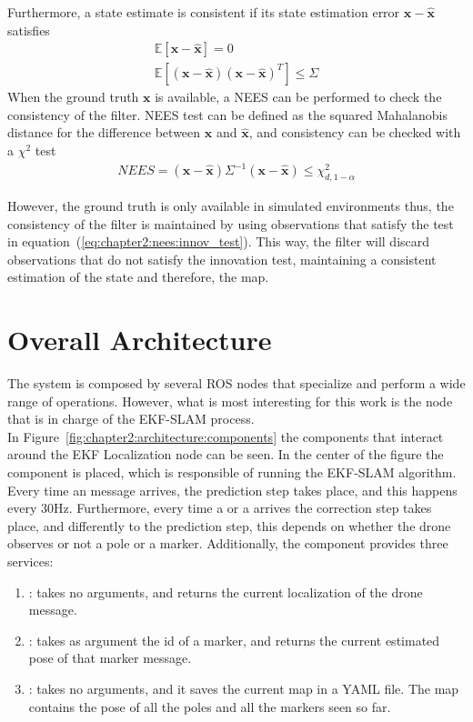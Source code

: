 Furthermore, a state estimate is consistent if its state estimation error $\bm{x} - \bm{\hat{x}}$ satisfies
\begin{align*}
    \mathbb{E}\left[\bm{x} - \bm{\hat{x}}\right] = 0\\
    \mathbb{E}\left[\left(\bm{x} - \bm{\hat{x}}\right)\left(\bm{x} - \bm{\hat{x}}\right)^T\right] \le \Sigma
\end{align*}
When the ground truth $\bm{x}$ is available, a \ac{NEES} can be performed to check the consistency of the filter. NEES test can be defined as the squared Mahalanobis distance for the difference between $\bm{x}$ and $\bm{\hat{x}}$, and consistency can be checked with a $\chi^2$ test
\begin{align*}
    NEES = \left(\bm{x} - \bm{\hat{x}}\right) \Sigma^{-1} \left(\bm{x} - \bm{\hat{x}}\right) \le \chi_{d, 1-\alpha}^2
\end{align*}

However, the ground truth is only available in simulated environments thus, the consistency of the filter is maintained by using observations that satisfy the test in equation~(\ref{eq:chapter2:nees:innov_test}). This way, the filter will discard observations that do not satisfy the innovation test, maintaining a consistent estimation of the state and therefore, the map.

\section{Overall Architecture}
\label{sec:chapter2:arch}
The system is composed by several ROS nodes that specialize and perform a wide range of operations. However, what is most interesting for this work is the node that is in charge of the EKF-SLAM process. \\

In Figure~\ref{fig:chapter2:architecture:components} the components that interact around the EKF Localization node can be seen. In the center of the figure the  component is placed, which is responsible of running the EKF-SLAM algorithm. Every time an  message arrives, the prediction step takes place, and this happens every 30Hz. Furthermore, every time a  or a  arrives the correction step takes place, and differently to the prediction step, this depends on whether the drone observes or not a pole or a marker. Additionally, the  component provides three services:
\begin{enumerate}
    \item {}: takes no arguments, and returns the current localization of the drone  message.
    \item {}: takes as argument the id of a marker, and returns the current estimated pose of that marker message.
    \item {}: takes no arguments, and it saves the current map in a YAML file. The map contains the pose of all the poles and all the markers seen so far.
\end{enumerate}

